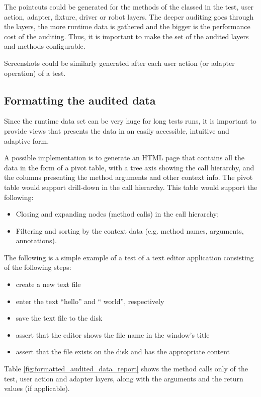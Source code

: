 The pointcuts could be generated for the methods of the classed in the test, user action, adapter, fixture, driver or robot layers. The deeper auditing goes through the layers, the more runtime data is gathered and the bigger is the performance cost of the auditing. Thus, it is important to make the set of the audited layers and methods configurable.

Screenshots could be similarly generated after each user action (or adapter operation) of a test.

\subsection {Formatting the audited data}

Since the runtime data set can be very huge for long tests runs, it is important to provide views that presents the data in an easily accessible, intuitive and adaptive form. 

A possible implementation is to generate an HTML page that contains all the data in the form of a pivot table, with a tree axis showing the call hierarchy, and the columns presenting the method arguments and other context info. The pivot table would support drill-down in the call hierarchy. This table would support the following:
\begin{itemize}
\item Closing and expanding nodes (method calls) in the call hierarchy;
\item Filtering and sorting by the context data (e.g. method names, arguments, annotations).
\end{itemize}

The following is a simple example of a test of a text editor application consisting of the following steps:
\begin{itemize}
\item create a new text file
\item enter the text ``hello'' and `` world'', respectively
\item save the text file to the disk
\item assert that the editor shows the file name in the window's title
\item assert that the file exists on the disk and has the appropriate content
\end{itemize}

Table \ref{fig:formatted_audited_data_report} shows the method calls only of the test, user action and adapter layers, along with the arguments and the return values (if applicable).

